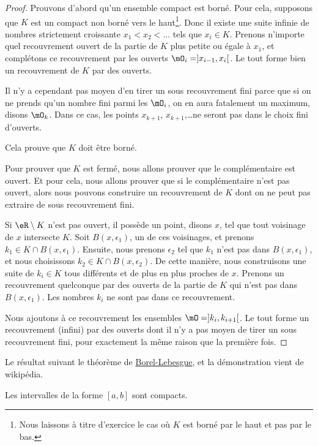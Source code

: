 \begin{proof}
Prouvons d'abord qu'un ensemble compact est borné. Pour cela, supposons que $K$ est un compact non borné vers le haut\footnote{Nous laissons à titre d'exercice le cas où $K$ est borné par le haut et pas par le bas.}. Donc il existe une suite infinie de nombres strictement croissante $x_1<x_2<\ldots$ tels que $x_i\in K$. Prenons n'importe quel recouvrement ouvert de la partie de $K$ plus petite ou égale à $x_1$, et complétons ce recouvrement par les ouverts $\mO_i=]x_{i-1},x_i[$. Le tout forme bien un recouvrement de $K$ par des ouverts. 

Il n'y a cependant pas moyen d'en tirer un sous recouvrement fini parce que si on ne prends qu'un nombre fini parmi les $\mO_i$, on en aura fatalement un maximum, disons $\mO_k$. Dans ce cas, les points $x_{k+1}$, $x_{k+1}$,\ldots ne seront pas dans le choix fini d'ouverts.

Cela prouve que $K$ doit être borné.

Pour prouver que $K$ est fermé, nous allons prouver que le complémentaire est ouvert. Et pour cela, nous allons prouver que si le complémentaire n'est pas ouvert, alors nous pouvons construire un recouvrement de $K$ dont on ne peut pas extraire de sous recouvrement fini.

Si $\eR\setminus K$ n'est pas ouvert, il possède un point, disons $x$, tel que tout voisinage de $x$ intersecte $K$. Soit $B(x,\epsilon_1)$, un de ces voisinages, et prenons $k_1\in K\cap B(x,\epsilon_1)$. Ensuite, nous prenons $\epsilon_2$ tel que $k_1$ n'est pas dans $B(x,\epsilon_1)$, et nous choisissons $k_2\in K\cap B(x,\epsilon_2)$. De cette manière, nous construisons une suite de $k_i\in K$ tous différents et de plus en plus proches de $x$. Prenons un recouvrement quelconque par des ouverts de la partie de $K$ qui n'est pas dans $B(x,\epsilon_1)$. Les nombres $k_i$ ne sont pas dans ce recouvrement.

Nous ajoutons à ce recouvrement les ensembles $\mO=]k_i,k_{i+1}[$. Le tout forme un recouvrement (infini) par des ouverts dont il n'y a pas moyen de tirer un sous recouvrement fini, pour exactement la même raison que la première fois.
\end{proof}

Le résultat suivant le théorème de \href{http://fr.wikipedia.org/wiki/Théorème_de_Heine-Borel}{Borel-Lebesgue}, et la démonstration vient de wikipédia.
\begin{theorem}   \label{ThoBOrelLebesgue}
    Les intervalles de la forme $[a,b]$ sont compacts.
\end{theorem}

